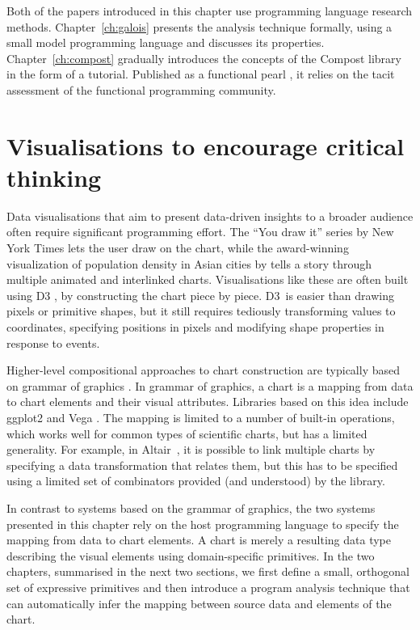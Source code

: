 \documentclass[fleqn,11pt]{report}
\theoremstyle{definition}
\begin{document}
Both of the papers introduced in this chapter use programming language research methods.
Chapter~\ref{ch:galois} presents the analysis technique formally, using a small model
programming language and discusses its properties. Chapter~\ref{ch:compost} gradually introduces
the concepts of the Compost library in the form of a tutorial. Published as a
functional pearl \citep{gibbons-2010-pearl}, it relies on the tacit assessment of the functional
programming community.

\section{Visualisations to encourage critical thinking}

Data visualisations that aim to present data-driven insights to a broader audience often
require significant programming effort. The ``You draw it'' series by New York Times
\citep{aisch-2015-youdraw} lets the user draw on the chart, while the award-winning visualization
of population density in Asian cities by \cite{bremer-2015-asia} tells a story through multiple
animated and interlinked charts. Visualisations like these are often built using D3
\citep{bostock-2011-d3}, by constructing the chart piece by piece. D3~is easier than drawing
pixels or primitive shapes, but it still requires tediously transforming values to coordinates,
specifying positions in pixels and modifying shape properties in response to events.

Higher-level compositional approaches to chart construction are typically based on grammar of
graphics \citep{wilkinson-1999-grammar}. In grammar of graphics, a chart is a mapping from
data to chart elements and their visual attributes. Libraries based on this idea include
ggplot2 \citep{satyanaran-2016-vega,wickham-2016-ggplot2} and Vega \citep{wickham-2010-layered}.
The mapping is limited to a number of built-in operations, which works well for common types of
scientific charts, but has a limited generality. For example, in Altair~\citep{vanderplas-2018-altair},
it is possible to link multiple charts by specifying a data transformation that relates them,
but this has to be specified using a limited set of combinators provided (and understood) by the
library.

In contrast to systems based on the grammar of graphics, the two systems presented in this chapter
rely on the host programming language to specify the mapping from data to chart elements. A chart
is merely a resulting data type describing the visual elements using domain-specific primitives.
In the two chapters, summarised in the next two sections, we first define a small, orthogonal set
of expressive primitives and then introduce a program analysis technique that can automatically
infer the mapping between source data and elements of the chart.
\end{document}
